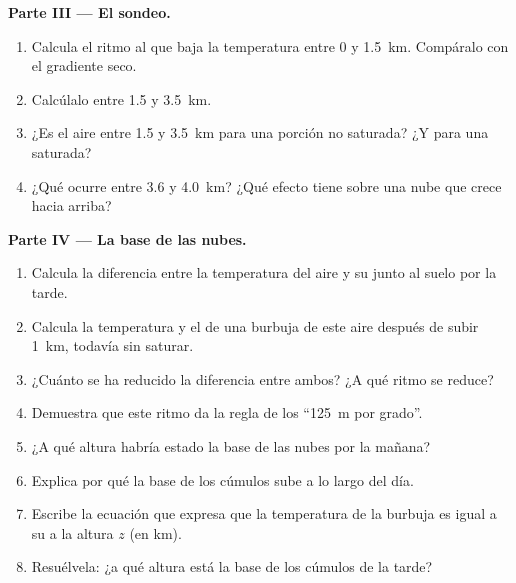 \begin{problem}
\medskip
\noindent\textbf{Parte III --- El sondeo.}
\begin{enumerate}[resume]
  \item Calcula el ritmo al que baja la temperatura entre \num{0} y
        \qty{1.5}{km}. Compáralo con el gradiente seco.
  \item Calcúlalo entre \num{1.5} y \qty{3.5}{km}.
  \item ¿Es  el aire entre \num{1.5} y \qty{3.5}{km} para una porción
        no saturada? ¿Y para una saturada?
  \item ¿Qué ocurre entre \num{3.6} y \qty{4.0}{km}? ¿Qué efecto tiene sobre
        una nube que crece hacia arriba?
\end{enumerate}

\medskip
\noindent\textbf{Parte IV --- La base de las nubes.}
\begin{enumerate}[resume]
  \item Calcula la diferencia entre la temperatura del aire y su  junto al suelo por la tarde.
  \item Calcula la temperatura y el  de una burbuja de este
        aire después de subir \qty{1}{km}, todavía sin saturar.
  \item ¿Cuánto se ha reducido la diferencia entre ambos? ¿A qué ritmo se
        reduce?
  \item Demuestra que este ritmo da la regla de los ``\qty{125}{m} por
        grado''.
  \item ¿A qué altura habría estado la base de las nubes por la mañana?
  \item Explica por qué la base de los cúmulos sube a lo largo del día.
  \item Escribe la ecuación que expresa que la temperatura de la burbuja es
        igual a su  a la altura $z$ (en km).
  \item Resuélvela: ¿a qué altura está la base de los cúmulos de la tarde?
\end{enumerate}
\end{problem}
